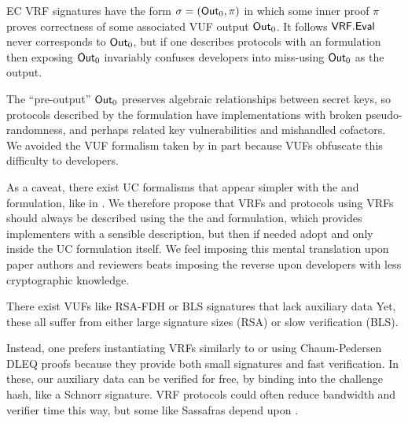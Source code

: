 EC VRF signatures have the form $\sigma = ({\mathsf{Out}}_0,\pi)$ in which some
inner proof $\pi$ proves correctness of some associated VUF output ${\mathsf{Out}}_0$. %
It follows ${\mathsf{VRF}}.{\mathsf{Eval}}$ never corresponds to ${\mathsf{Out}}_0$, but if one describes
protocols with an  formulation then exposing ${\mathsf{Out}}_0$
invariably confuses developers into miss-using ${\mathsf{Out}}_0$ as the output.

The ``pre-output'' ${\mathsf{Out}}_0$ preserves algebraic relationships between
secret keys, so protocols described by the  formulation
have implementations with broken pseudo-randomness, and perhaps
 related key vulnerabilities and mishandled cofactors.
We avoided the VUF formalism taken by \cite{agg_dkg} in part because
 VUFs obfuscate this difficulty to developers.

As a caveat, there exist UC formalisms that appear simpler with
the  and  formulation, like in \cite{praos}.
We therefore propose that VRFs and protocols using VRFs should always be
described using the the \Sign and \Verify formulation, which provides
implementers with a sensible description, but then if needed adopt
  and  only inside the UC formulation itself.
We feel imposing this mental translation upon paper authors and reviewers
 beats imposing the reverse upon developers with less cryptographic knowledge.

\smallskip

There exist VUFs like RSA-FDH or BLS signatures that lack auxiliary data
Yet, these all suffer from either large signature sizes (RSA) or
 slow verification (BLS).

Instead, one prefers instantiating VRFs similarly to
 \cite{nsec5} or \cite{VXEd25519} using Chaum-Pedersen DLEQ proofs \cite{CP92} %
 because they provide both small signatures and fast verification.
In these, our auxiliary data \aux can be verified for free,
by binding \aux into the challenge hash, like a Schnorr signature.
VRF protocols could often reduce bandwidth and verifier time this way,
 but some like Sassafras depend upon \aux. 





